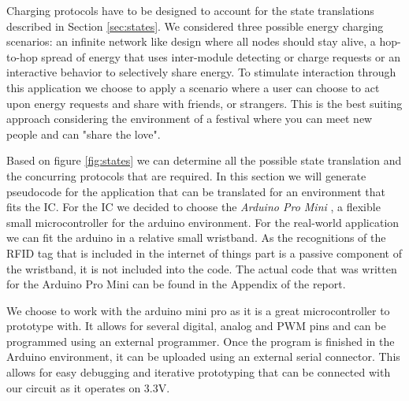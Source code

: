 %
Charging protocols have to be designed to account for the state translations described in Section \ref{sec:states}. We considered three possible energy charging scenarios: an infinite network like design where all nodes should stay alive, a hop-to-hop spread of energy that uses inter-module detecting or charge requests or an interactive behavior to selectively share energy. To stimulate interaction through this application we choose to apply a scenario where a user can choose to act upon energy requests and share with friends, or strangers. This is the best suiting approach considering the environment of a festival where you can meet new people and can "share the love". 

Based on figure \ref{fig:states} we can determine all the possible state translation and the concurring protocols that are required. In this section we will generate pseudocode for the application that can be translated for an environment that fits the IC. For the IC we decided to choose the \emph{Arduino Pro Mini} \cite{promini}, a flexible small microcontroller for the arduino environment. For the real-world application we can fit the arduino in a relative small wristband.  As the recognitions of the RFID tag that is included in the internet of things part is a passive component of the wristband, it is not included into the code. The actual code that was written for the Arduino Pro Mini can be found in the Appendix of the report. 

We choose to work with the arduino mini pro as it is a great microcontroller to prototype with. It allows for several digital, analog and PWM pins and can be programmed using an external programmer. Once the program is finished in the Arduino environment, it can be uploaded using an external serial connector. This allows for easy debugging and iterative prototyping that can be connected with our circuit as it operates on 3.3V.
\\

%


